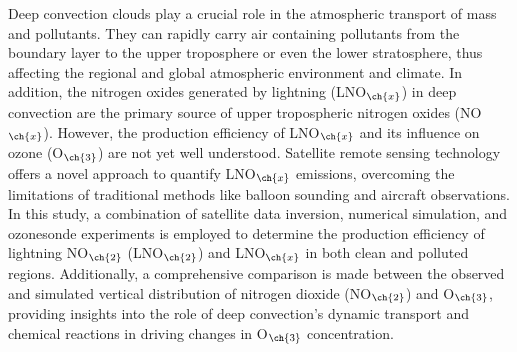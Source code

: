 {
Deep convection clouds play a crucial role in the atmospheric transport of mass and pollutants.
They can rapidly carry air containing pollutants from the boundary layer to the upper troposphere or even the lower stratosphere,
thus affecting the regional and global atmospheric environment and climate.
In addition, the nitrogen oxides generated by lightning (LNO$_{\ch{x}}$) in deep convection
are the primary source of upper tropospheric nitrogen oxides (NO$_{\ch{x}}$).
However, the production efficiency of LNO$_{\ch{x}}$ and its influence on ozone (O$_{\ch{3}}$) are not yet well understood.
Satellite remote sensing technology offers a novel approach to quantify LNO$_{\ch{x}}$ emissions, overcoming the limitations of traditional methods like balloon sounding and aircraft observations.
In this study, a combination of satellite data inversion, numerical simulation, and ozonesonde experiments is employed to determine the production efficiency of lightning NO$_{\ch{2}}$ (LNO$_{\ch{2}}$) and LNO$_{\ch{x}}$ in both clean and polluted regions.
Additionally, a comprehensive comparison is made between the observed and simulated vertical distribution of nitrogen dioxide (NO$_{\ch{2}}$) and O$_{\ch{3}}$, providing insights into the role of deep convection's dynamic transport and chemical reactions in driving changes in O$_{\ch{3}}$ concentration.

}
